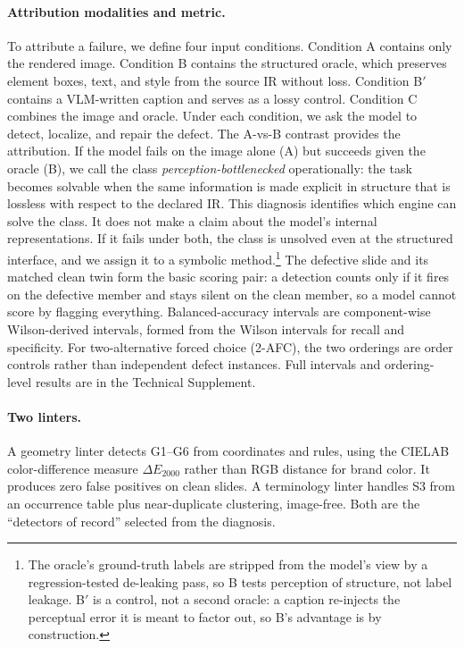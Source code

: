 \documentclass[letterpaper]{article}            %
\newcommand{\g}[1]{\textsf{#1}}        %
\begin{document}
\paragraph{Attribution modalities and metric.}
To attribute a failure, we define four input conditions. Condition A contains only the rendered image.
Condition B contains the structured oracle, which preserves element boxes, text, and style from the source
IR without loss. Condition B$'$ contains a VLM-written caption and serves as a lossy control. Condition C combines the image
and oracle. Under each condition, we ask the model to detect, localize, and repair the defect. The A-vs-B contrast provides the attribution. If
the model fails on the image alone (A) but succeeds given the oracle (B), we call the class
\emph{perception-bottlenecked} operationally: the task becomes solvable when the same information is made
explicit in structure that is lossless with respect to the declared IR. This diagnosis identifies which engine
can solve the class. It does not make a claim about the model's internal representations. If it fails under both, the class is unsolved even at the structured
interface, and we assign it to a symbolic method.\footnote{The oracle's ground-truth labels are stripped from the model's view by a
regression-tested de-leaking pass, so B tests perception of structure, not label leakage. B$'$ is a control,
not a second oracle: a caption re-injects the perceptual error it is meant to factor out, so B's advantage is
by construction.} The defective slide and its matched clean twin form the basic scoring pair: a detection
counts only if it fires on the defective member and stays silent on the clean member, so a model cannot score
by flagging everything. Balanced-accuracy intervals are component-wise Wilson-derived intervals, formed from
the Wilson intervals for recall and specificity. For two-alternative forced choice (2-AFC), the two orderings are order controls rather than independent defect
instances. Full intervals and ordering-level results are in the Technical Supplement.

\paragraph{Two linters.}
A geometry linter detects \g{G1}--\g{G6} from coordinates and rules, using the CIELAB color-difference
measure $\Delta E_{2000}$ rather than RGB distance for brand color. It produces zero false positives on clean
slides. A terminology linter handles \g{S3} from an occurrence
table plus near-duplicate clustering, image-free. Both are the ``detectors of record'' selected from the diagnosis.
\end{document}
